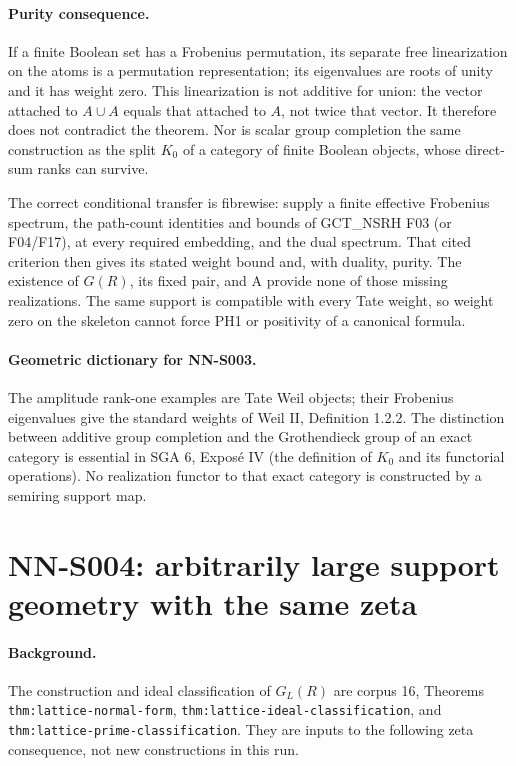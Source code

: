 \paragraph{Purity consequence.}
If a finite Boolean set has a Frobenius permutation, its separate
free linearization on the atoms is a permutation representation;
its eigenvalues are roots of unity and it has weight zero. This
linearization is not additive for union: the vector attached to
$A\cup A$ equals that attached to $A$, not twice that vector.
It therefore does not contradict the theorem. Nor is scalar
group completion the same construction as the split $K_0$ of a
category of finite Boolean objects, whose direct-sum ranks can survive.

The correct conditional transfer is fibrewise: supply a finite
effective Frobenius spectrum, the path-count identities and bounds
of GCT\_NSRH F03 (or F04/F17), at every required embedding, and the
dual spectrum. That cited criterion then gives its stated weight
bound and, with duality, purity. The existence of $G(R)$, its fixed
pair, and A provide none of those missing realizations. The same
support is compatible with every Tate weight, so weight zero on
the skeleton cannot force PH1 or positivity of a canonical formula.

\paragraph{Geometric dictionary for NN-S003.}
The amplitude rank-one examples are Tate Weil objects; their
Frobenius eigenvalues give the standard weights of Weil II,
Definition 1.2.2. The distinction between additive group completion
and the Grothendieck group of an exact category is essential in
SGA 6, Expos\'e IV (the definition of $K_0$ and its functorial
operations). No realization functor to that exact category is
constructed by a semiring support map.

\section{NN-S004: arbitrarily large support geometry with the same zeta}
\label{sec:NN-S004}

\paragraph{Background.} The construction and ideal classification
of $G_L(R)$ are corpus 16, Theorems \texttt{thm:lattice-normal-form},
\texttt{thm:lattice-ideal-classification}, and
\texttt{thm:lattice-prime-classification}. They are inputs to the
following zeta consequence, not new constructions in this run.


